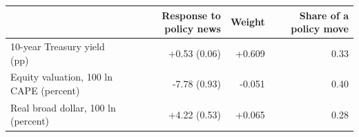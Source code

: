 \begin{tabular}{lrrr}
\toprule
 & Response to policy news & Weight & Share of a policy move \\
\midrule
10-year Treasury yield (pp) & +0.53 (0.06) & +0.609 & 0.33 \\
Equity valuation, 100 ln CAPE (percent) & -7.78 (0.93) & -0.051 & 0.40 \\
Real broad dollar, 100 ln (percent) & +4.22 (0.53) & +0.065 & 0.28 \\
\bottomrule
\end{tabular}
